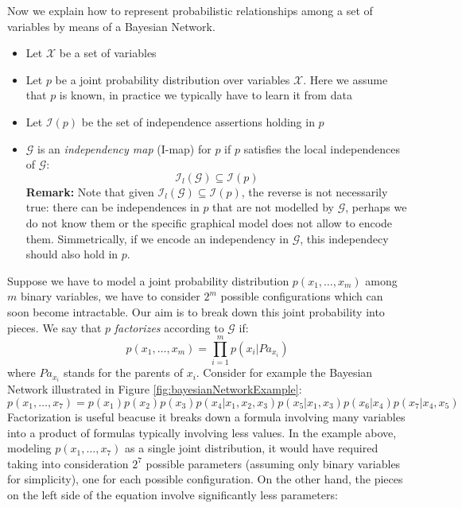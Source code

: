 Now we explain how to represent probabilistic relationships among a set of
variables by means of a Bayesian Network.
\begin{itemize}
	\item Let $\mathcal{X}$ be a set of variables

	\item Let $p$ be a joint probability distribution over variables $\mathcal{X}$.
		Here we assume that $p$ is known, in practice we typically have to learn it from
		data

	\item Let $\mathcal{I}(p)$ be the set of independence assertions holding in $p$

	\item $\mathcal{G}$ is an \textit{independency map} (I-map) for $p$ if $p$
		satisfies the local independences of $\mathcal{G}$:
		\[
			\mathcal{I}_{l}(\mathcal{G}) \subseteq \mathcal{I}(p)
		\]
		\textbf{Remark:} Note that given
		$\mathcal{I}_{l}(\mathcal{G}) \subseteq \mathcal{I}(p)$, the reverse is not necessarily
		true: there can be independences in $p$ that are not modelled by
		$\mathcal{G}$, perhaps we do not know them or the specific graphical model does
		not allow to encode them. Simmetrically, if we encode an independency in $\mathcal{G}$,
		this independecy should also hold in $p$.
\end{itemize}
Suppose we have to model a joint probability distribution $p(x_{1}, \hdots, x_{m}
)$ among $m$ binary variables, we have to consider $2^{m}$ possible
configurations which can soon become intractable. Our aim is to break down this joint
probability into pieces. We say that $p$ \textit{factorizes} according to $\mathcal{G}$
if:
\[
	p(x_{1}, \hdots, x_{m}) = \prod_{i=1}^{m}p(x_{i}| \mathit{Pa}_{x_i})
\]
where $\mathit{Pa}_{x_i}$ stands for the parents of $x_{i}$. Consider for example
the Bayesian Network illustrated in Figure \ref{fig:bayesianNetworkExample}:
\[
	p(x_{1}, \hdots, x_{7}) = p(x_{1})p(x_{2})p(x_{3})p(x_{4}|x_{1},x_{2},x_{3})p(x
	_{5}|x_{1},x_{3})p(x_{6}|x_{4})p(x_{7}|x_{4},x_{5})
\]
Factorization is useful beacuse it breaks down a formula involving many
variables into a product of formulas typically involving less values. In the example
above, modeling $p(x_{1},\hdots, x_{7})$ as a single joint distribution, it would
have required taking into consideration $2^{7}$ possible parameters (assuming
only binary variables for simplicity), one for each possible configuration. On the
other hand, the pieces on the left side of the equation involve significantly
less parameters:
